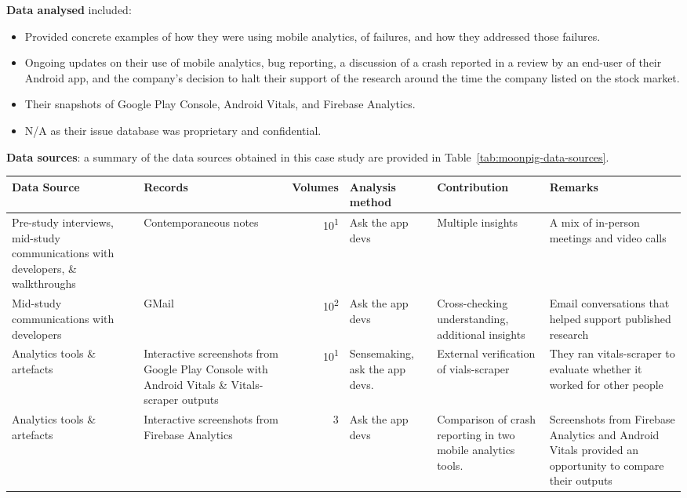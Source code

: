 \textbf{Data analysed} included:

\begin{itemize}
    \item[Contemporaneous notes]  
    Provided concrete examples of how they were using mobile analytics, of failures, and how they addressed those failures.
    \item[Emails] 
    Ongoing updates on their use of mobile analytics, bug reporting, a discussion of a crash reported in a review by an end-user of their Android app, and the company's decision to halt their support of the research around the time the company listed on the stock market.
    \item[Mobile analytics] 
    Their snapshots of Google Play Console, Android Vitals, and Firebase Analytics.
    \item[Issues database] 
    N/A as their issue database was proprietary and confidential.
\end{itemize}

\textbf{Data sources}: a summary of the data sources obtained in this case study are provided in Table~\ref{tab:moonpig-data-sources}.

\begin{table*}
    \centering
    \footnotesize
    \tabcolsep=0.12cm
    \begin{tabular}{p{2.6cm}p{2.9cm}r>{\raggedright}p{2.1cm}>{\raggedright\arraybackslash}p{2.5cm}>{\raggedright\arraybackslash}p{3cm}}
        Data Source & Records & Volumes & Analysis method & Contribution & Remarks \\
        \toprule
         Pre-study interviews, mid-study communications with developers, \& walkthroughs & Contemporaneous notes & 10\textsuperscript{1} & Ask the app devs & Multiple insights & A mix of in-person meetings and video calls  \\
         Mid-study communications with developers & GMail & 10\textsuperscript{2} & Ask the app devs & Cross-checking understanding, additional insights & Email conversations that helped support published research \\
         Analytics tools \& artefacts &Interactive screenshots from Google Play Console with Android Vitals \& Vitals-scraper outputs &10\textsuperscript{1} & Sensemaking, ask the app devs. & External verification of vials-scraper & They ran vitals-scraper to evaluate whether it worked for other people \\
         Analytics tools \& artefacts & Interactive screenshots from Firebase Analytics & 3 & Ask the app devs & Comparison of crash reporting in two mobile analytics tools. & Screenshots from Firebase Analytics and Android Vitals provided an opportunity to compare their outputs \\
         \bottomrule
    \end{tabular}
    \caption{Moonpig: data sources}
    \label{tab:moonpig-data-sources}
\end{table*}

